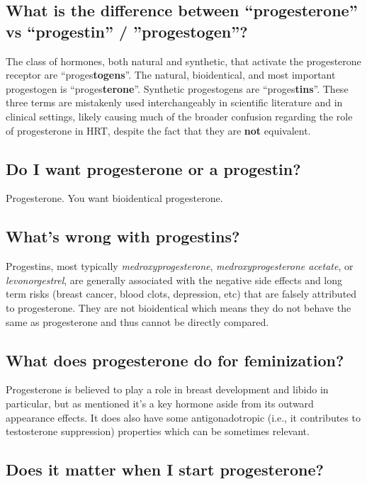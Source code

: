\documentclass{article}
\begin{document}
{{\subsection{What is the difference between “progesterone” vs “progestin” / ”progestogen”?}

The class of hormones, both natural and synthetic, that activate the progesterone receptor are “proges\textbf{togens}”. The natural, bioidentical, and most important progestogen is “proges\textbf{terone}”. Synthetic progestogens are “proges\textbf{tins}”. These three terms are mistakenly used interchangeably in scientific literature and in clinical settings, likely causing much of the broader confusion regarding the role of progesterone in HRT, despite the fact that they are \textbf{not }equivalent.

\subsection{Do I want progesterone or a progestin?}

Progesterone. You want bioidentical progesterone.

\subsection{What’s wrong with progestins?}

Progestins, most typically \textit{medroxyprogesterone}, \textit{medroxyprogesterone acetate}, or \textit{levonorgestrel}, are generally associated with the negative side effects and long term risks (breast cancer, blood clots, depression, etc) that are falsely attributed to progesterone. They are not bioidentical which means they do not behave the same as progesterone and thus cannot be directly compared.

\subsection{What does progesterone do for feminization?}

Progesterone is believed to play a role in breast development and libido in particular, but as mentioned it’s a key hormone aside from its outward appearance effects. It does also have some antigonadotropic (i.e., it contributes to testosterone suppression) properties which can be sometimes relevant.

\subsection{Does it matter when I start progesterone?}

}}
\end{document}
